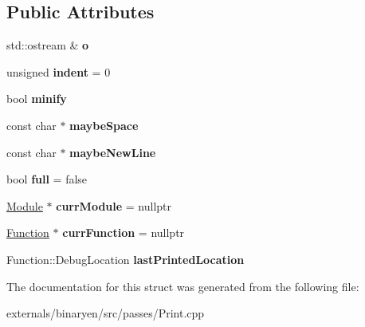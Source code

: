 \subsection*{Public Attributes}
\begin{DoxyCompactItemize}
\item 
\mbox{\label{structwasm_1_1_print_s_expression_a4b93839c798e3745414886682e2adf1c}} 
std\+::ostream \& {\bfseries o}
\item 
\mbox{\label{structwasm_1_1_print_s_expression_a24bb8ce6b2f8371a30680af91a51d01f}} 
unsigned {\bfseries indent} = 0
\item 
\mbox{\label{structwasm_1_1_print_s_expression_a7434d820ef92aaf31edefdb313849749}} 
bool {\bfseries minify}
\item 
\mbox{\label{structwasm_1_1_print_s_expression_ab3fad8cb2d5388a02f15813de1ec4198}} 
const char $\ast$ {\bfseries maybe\+Space}
\item 
\mbox{\label{structwasm_1_1_print_s_expression_a5bf5293ea1a42f95c6bd3099d1bf80b2}} 
const char $\ast$ {\bfseries maybe\+New\+Line}
\item 
\mbox{\label{structwasm_1_1_print_s_expression_abafb29b2cab4e33ce5d582ec19d000cc}} 
bool {\bfseries full} = false
\item 
\mbox{\label{structwasm_1_1_print_s_expression_a1fa078d5fbd372080128fbc140cc358b}} 
\mbox{\hyperlink{classwasm_1_1_module}{Module}} $\ast$ {\bfseries curr\+Module} = nullptr
\item 
\mbox{\label{structwasm_1_1_print_s_expression_ade46c5b5d91e8549c40587491135dff0}} 
\mbox{\hyperlink{classwasm_1_1_function}{Function}} $\ast$ {\bfseries curr\+Function} = nullptr
\item 
\mbox{\label{structwasm_1_1_print_s_expression_a9805c45f53c202848c1d018a59b8ff62}} 
Function\+::\+Debug\+Location {\bfseries last\+Printed\+Location}
\end{DoxyCompactItemize}


The documentation for this struct was generated from the following file\+:\begin{DoxyCompactItemize}
\item 
externals/binaryen/src/passes/Print.\+cpp\end{DoxyCompactItemize}
